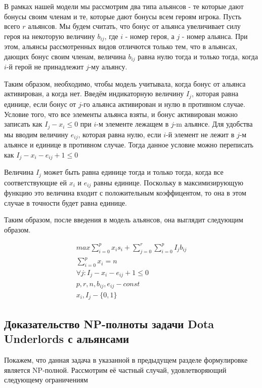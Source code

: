 \documentclass{article}
\begin{document}
В рамках нашей модели мы рассмотрим два типа альянсов - те которые дают бонусы своим членам и те, которые дают бонусы всем героям игрока. Пусть всего $r$ альянсов. Мы будем считать, что бонус от альянса увеличивает силу героя на некоторую величину $b_{ij}$, где $i$ - номер героя, а $j$ - номер альянса. При этом, альянсы рассмотренных видов отличются только тем, что в альянсах, дающих бонус своим членам, величина $b_{ij}$ равна нулю тогда и только тогда, когда $i$-й герой не принадлежит $j$-му альянсу.

Таким образом, необходимо, чтобы модель учитывала, когда бонус от альянса активирован, а когда нет. Введём индикаторную величину $I_j$, которая равна единице, если бонус от $j$-го альянса активирован и нулю в противном случае. Условие того, что все элементы альянса взяты, и бонус активирован можно записать как $I_j - x_i \leq 0$ при $i$-м элементе лежащем в $j$-m альянсе. Для удобства мы вводим величину $e_{ij}$, которая равна нулю, если $i$-й элемент не лежит в $j$-м альянсе и единице в противном случае. Тогда данное условие можно переписать как $I_j - x_i - e_{ij} + 1 \leq 0$

Величина $I_j$ может быть равна единице тогда и только тогда, когда все соответствующие ей $x_i$ и $e_{ij}$ равны единице. Поскольку в максимизирующую функцию это величина входит с положительным коэффицентом, то она в этом случае в точности будет равна единице.

Таким образом, после введения в модель альянсов, она выглядит следующим образом.

\begin{equation}
\begin{gathered}
    max \sum_{i=0}^p x_i s_i + \sum_{j=0}^r \sum_{i=0}^p I_{j} b_{ij} \\
    \sum_{i=0}^p x_i = n \\
    \forall j : I_j - x_i - e_{ij} + 1 \leq 0 \\
    p, r, n, b_{ij}, e_{ij} - const \\
    x_i, I_j - \{0, 1\}
\end{gathered}
\end{equation}

\subsection{Доказательство NP-полноты задачи Dota Underlords с альянсами}

Покажем, что данная задача в указанной в предыдущем разделе формулировке является NP-полной. Рассмотрим её частный случай, удовлетворяющий следующему ограничениям 
\end{document}
